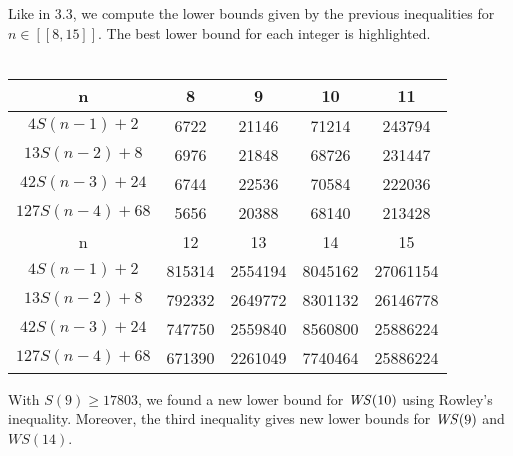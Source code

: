 Like in 3.3, we compute the lower bounds given by the previous inequalities for \( n \in [\![8,15]\!] \). The best lower bound
for each integer is highlighted.\\
\\
\begin{center}
\begin{tabular}{|*{5}{c|}}
    \hline
	n & 8 & 9 & 10 & 11 \\
	\hline
	\(4S(n-1) + 2 \) & 6722 & 21146 & \cellcolor{yellow} 71214 & \cellcolor{yellow} 243794\\
	\hline
	\(13S(n-2) + 8 \) & \cellcolor{yellow} 6976 & 21848 & 68726 & 231447\\
	\hline
	\(42S(n-3) + 24 \) & 6744 & \cellcolor{yellow} 22536 & 70584 & 222036 \\
	\hline
	\(127S(n-4) + 68 \) & 5656 & 20388 & 68140 & 213428\\
	\hline
	\hline
	n & 12 & 13 & 14 & 15 \\
	\hline
	\(4S(n-1) + 2 \) & \cellcolor{yellow} 815314 & 2554194 & 8045162 & \cellcolor{yellow} 27061154\\
	\hline
	\(13S(n-2) + 8 \) & 792332 & \cellcolor{yellow}2649772 & 8301132 & 26146778 \\
	\hline
	\(42S(n-3) + 24 \) & 747750 & 2559840 & \cellcolor{yellow} 8560800 &  25886224 \\
	\hline
	\(127S(n-4) + 68 \) & 671390 & 2261049 & 7740464 & 25886224 \\
	\hline
\end{tabular}
\end{center}

With \( S(9) \geqslant 17803 \), we found a new lower bound for \(\mathit{WS}(10)\) using Rowley's inequality.
Moreover, the third inequality gives new lower bounds for \(\mathit{WS}(9)\) and \(WS(14)\).
